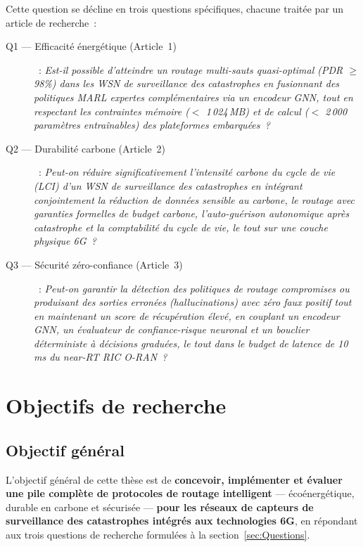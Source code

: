 \medskip
Cette question se décline en trois questions spécifiques, chacune traitée par un article de recherche~:

\begin{description}
    \item[Q1 --- Efficacité énergétique (Article~1)]~: \emph{Est-il possible d'atteindre un routage multi-sauts quasi-optimal (PDR $\geq$ 98\%) dans les WSN de surveillance des catastrophes en fusionnant des politiques MARL expertes complémentaires via un encodeur GNN, tout en respectant les contraintes mémoire ($<$ 1\,024\,MB) et de calcul ($<$ 2\,000 paramètres entraînables) des plateformes embarquées~?}

    \item[Q2 --- Durabilité carbone (Article~2)]~: \emph{Peut-on réduire significativement l'intensité carbone du cycle de vie (LCI) d'un WSN de surveillance des catastrophes en intégrant conjointement la réduction de données sensible au carbone, le routage avec garanties formelles de budget carbone, l'auto-guérison autonomique après catastrophe et la comptabilité du cycle de vie, le tout sur une couche physique 6G~?}

    \item[Q3 --- Sécurité zéro-confiance (Article~3)]~: \emph{Peut-on garantir la détection des politiques de routage compromises ou produisant des sorties erronées (hallucinations) avec zéro faux positif tout en maintenant un score de récupération élevé, en couplant un encodeur GNN, un évaluateur de confiance-risque neuronal et un bouclier déterministe à décisions graduées, le tout dans le budget de latence de 10\,ms du near-RT RIC O-RAN~?}
\end{description}


\section{Objectifs de recherche}\label{sec:Objectifs}

\subsection{Objectif général}

L'objectif général de cette thèse est de \textbf{concevoir, implémenter et évaluer une pile complète de protocoles de routage intelligent} --- écoénergétique, durable en carbone et sécurisée --- \textbf{pour les réseaux de capteurs de surveillance des catastrophes intégrés aux technologies 6G}, en répondant aux trois questions de recherche formulées à la section~\ref{sec:Questions}.

